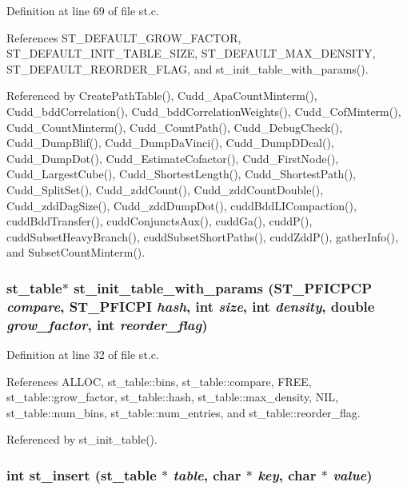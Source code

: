 Definition at line 69 of file st.c.

References ST\_\-DEFAULT\_\-GROW\_\-FACTOR, ST\_\-DEFAULT\_\-INIT\_\-TABLE\_\-SIZE, ST\_\-DEFAULT\_\-MAX\_\-DENSITY, ST\_\-DEFAULT\_\-REORDER\_\-FLAG, and st\_\-init\_\-table\_\-with\_\-params().

Referenced by Create\-Path\-Table(), Cudd\_\-Apa\-Count\-Minterm(), Cudd\_\-bdd\-Correlation(), Cudd\_\-bdd\-Correlation\-Weights(), Cudd\_\-Cof\-Minterm(), Cudd\_\-Count\-Minterm(), Cudd\_\-Count\-Path(), Cudd\_\-Debug\-Check(), Cudd\_\-Dump\-Blif(), Cudd\_\-Dump\-Da\-Vinci(), Cudd\_\-Dump\-DDcal(), Cudd\_\-Dump\-Dot(), Cudd\_\-Estimate\-Cofactor(), Cudd\_\-First\-Node(), Cudd\_\-Largest\-Cube(), Cudd\_\-Shortest\-Length(), Cudd\_\-Shortest\-Path(), Cudd\_\-Split\-Set(), Cudd\_\-zdd\-Count(), Cudd\_\-zdd\-Count\-Double(), Cudd\_\-zdd\-Dag\-Size(), Cudd\_\-zdd\-Dump\-Dot(), cudd\-Bdd\-LICompaction(), cudd\-Bdd\-Transfer(), cudd\-Conjuncts\-Aux(), cudd\-Ga(), cudd\-P(), cudd\-Subset\-Heavy\-Branch(), cudd\-Subset\-Short\-Paths(), cudd\-Zdd\-P(), gather\-Info(), and Subset\-Count\-Minterm().
\subsubsection{\setlength{\rightskip}{0pt plus 5cm}\bf{st\_\-table}$\ast$ st\_\-init\_\-table\_\-with\_\-params (\bf{ST\_\-PFICPCP} {\em compare}, \bf{ST\_\-PFICPI} {\em hash}, int {\em size}, int {\em density}, double {\em grow\_\-factor}, int {\em reorder\_\-flag})}\label{st_8c_88896d7ce4715597cba13ff35952e0b5}




Definition at line 32 of file st.c.

References ALLOC, st\_\-table::bins, st\_\-table::compare, FREE, st\_\-table::grow\_\-factor, st\_\-table::hash, st\_\-table::max\_\-density, NIL, st\_\-table::num\_\-bins, st\_\-table::num\_\-entries, and st\_\-table::reorder\_\-flag.

Referenced by st\_\-init\_\-table().
\subsubsection{\setlength{\rightskip}{0pt plus 5cm}int st\_\-insert (\bf{st\_\-table} $\ast$ {\em table}, char $\ast$ {\em key}, char $\ast$ {\em value})}\label{st_8c_f49cc6904c1ca19f009c4523f61d8591}




